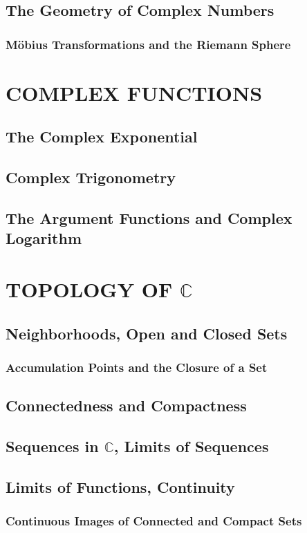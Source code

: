 \documentclass[hidelinks,12pt]{article}
\theoremstyle{definition}
\begin{document}
  \subsection{The Geometry of Complex Numbers}
  \subsubsection{Möbius Transformations and the Riemann Sphere}


  \section{COMPLEX FUNCTIONS}
  \subsection{The Complex Exponential}
  \subsection{Complex Trigonometry}
  \subsection{The Argument Functions and Complex Logarithm}


  \section{TOPOLOGY OF $\mathbb{C}$}
  \subsection{Neighborhoods, Open and Closed Sets}
  \subsubsection{Accumulation Points and the Closure of a Set}
  \subsection{Connectedness and Compactness}
  \subsection{Sequences in $\mathbb{C}$, Limits of Sequences}
  \subsection{Limits of Functions, Continuity}
  \subsubsection{Continuous Images of Connected and Compact Sets}
\end{document}
